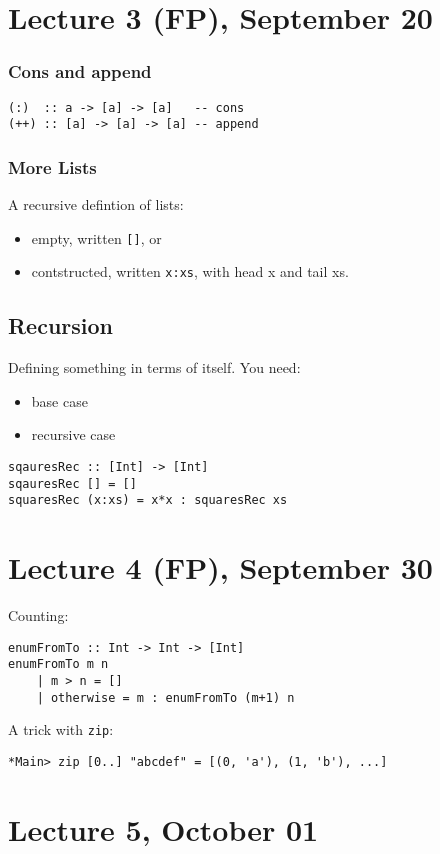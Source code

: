 \documentclass{article}
\begin{document}
\section{Lecture 3 (FP), September 20}
\subsubsection{Cons and append}
\begin{verbatim}
(:)  :: a -> [a] -> [a]   -- cons
(++) :: [a] -> [a] -> [a] -- append
\end{verbatim}
\subsubsection{More Lists}
A recursive defintion of lists:
\begin{itemize}
    \item empty, written \texttt{[]}, or
    \item contstructed, written \texttt{x:xs}, with head x and tail xs.
\end{itemize}
\subsection{Recursion}
Defining something in terms of itself.
You need:
\begin{itemize}
    \item base case
    \item recursive case
\end{itemize}
\begin{verbatim}
sqauresRec :: [Int] -> [Int]
sqauresRec [] = []
squaresRec (x:xs) = x*x : squaresRec xs
\end{verbatim}
\section{Lecture 4 (FP), September 30}
Counting:
\begin{verbatim}
enumFromTo :: Int -> Int -> [Int]
enumFromTo m n
    | m > n = []
    | otherwise = m : enumFromTo (m+1) n
\end{verbatim}
A trick with \texttt{zip}:
\begin{verbatim}
*Main> zip [0..] "abcdef" = [(0, 'a'), (1, 'b'), ...]
\end{verbatim}
\section{Lecture 5, October 01}
\end{document}
